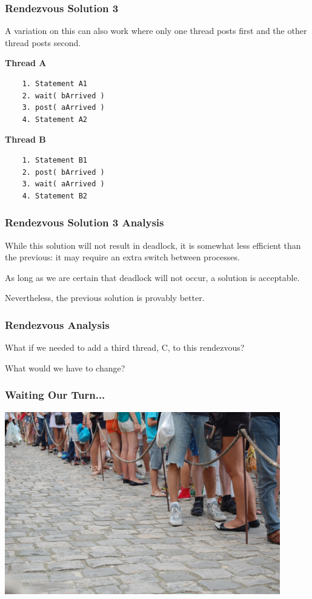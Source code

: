 \begin{frame}[fragile]
	\frametitle{Rendezvous Solution 3}

	A variation on this can also work where only one thread posts first and the other thread posts second.

	\begin{multicols}{2}
		\textbf{Thread A}
		\begin{verbatim}
	1. Statement A1
	2. wait( bArrived )
	3. post( aArrived )
	4. Statement A2
  \end{verbatim}
		\columnbreak
		\textbf{Thread B}
		\begin{verbatim}
	1. Statement B1
	2. post( bArrived )
	3. wait( aArrived )
	4. Statement B2
  \end{verbatim}
	\end{multicols}
	\vspace{-2em}


\end{frame}

\begin{frame}
	\frametitle{Rendezvous Solution 3 Analysis}

	While this solution will not result in deadlock, it is somewhat less efficient than the previous: it may require an extra switch between processes.

	As long as we are certain that deadlock will not occur, a solution is acceptable.

	Nevertheless, the previous solution is provably better.

\end{frame}


\begin{frame}
	\frametitle{Rendezvous Analysis}

	What if we needed to add a third thread, C, to this rendezvous?

	What would we have to change?


\end{frame}



\begin{frame}
	\frametitle{Waiting Our Turn...}

	\begin{center}
		\includegraphics[width=0.9\textwidth]{images/waiting-in-line.jpg}
	\end{center}

\end{frame}


